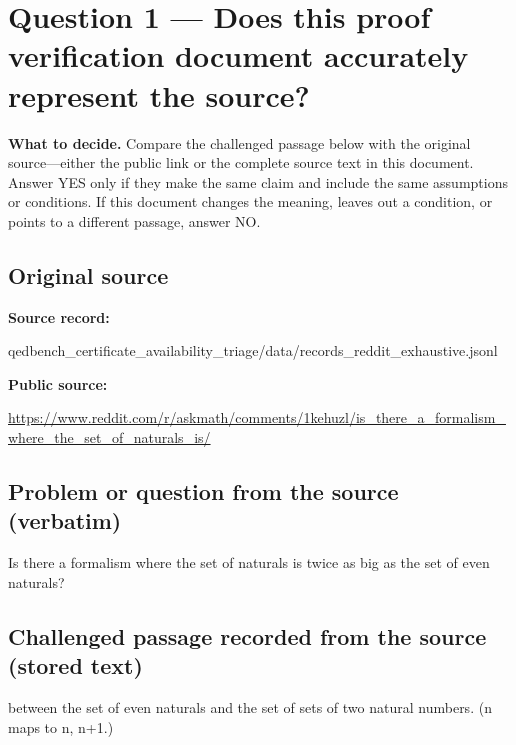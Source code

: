 \documentclass[11pt]{article}
\begin{document}
\section*{Question 1 --- Does this proof verification document accurately represent the source?}
\textbf{What to decide.} Compare the challenged passage below with the original source---either the public link or the complete source text in this document. Answer YES only if they make the same claim and include the same assumptions or conditions. If this document changes the meaning, leaves out a condition, or points to a different passage, answer NO.
\subsection*{Original source}
\textbf{Source record:}
\begin{Vsrc}
qedbench_certificate_availability_triage/data/records_reddit_exhaustive.jsonl
\end{Vsrc}
\textbf{Public source:}\par
\url{https://www.reddit.com/r/askmath/comments/1kehuzl/is_there_a_formalism_where_the_set_of_naturals_is/}\par
\subsection*{Problem or question from the source (verbatim)}
\begin{Vsrc}
Is there a formalism where the set of naturals is twice as big as the set of even naturals?
\end{Vsrc}
\subsection*{Challenged passage recorded from the source (stored text)}
\begin{Vsrc}
between the set of even naturals and the set of sets of two natural numbers.  (n maps to {n, n+1}.)
\end{Vsrc}
\end{document}
